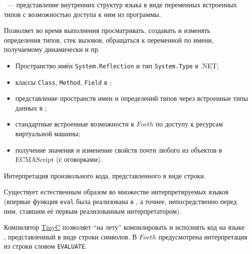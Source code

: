 
\ --- представление внутренних структур
языка в виде переменных встроенных типов с возможностью доступа к ним из
программы.

Позволяет во время выполнения просматривать, создавать и изменять определения
типов, стек вызовов, обращаться к переменной по имени, получаемому динамически и
пр.

\begin{itemize}[nosep]
  \item 
Пространство имён \verb|System.Reflection| и тип \verb|System.Type| в .NET;
  \item 
классы \verb|Class|, \verb|Method|, \verb|Field| в \java;
  \item 
представление пространств имен и определений типов через встроенные типы данных
в \py;
  \item 
стандартные встроенные возможности в $Forth$ по доступу к ресурсам виртуальной
машины;
  \item 
получение значения и изменение свойств почти любого из объектов в ECMAScript (с
оговорками).
\end{itemize}


Интерпретация произвольного кода, представленного в виде строки.

Существует естественным образом во множестве интерпретируемых языков (впервые
функция \verb|eval| была реализована в \lisp, а точнее, непосредственно перед
ним, ставшим её первым реализованным интерпретатором).

Компилятор \href{https://ru.wikipedia.org/wiki/Tiny_C_Compiler}{TinyC} позволяет
``на лету'' компилировать и исполнять код на языке \ci, представленный в виде
строки символов. В
\href{https://ru.wikipedia.org/wiki/%D0%A4%D0%BE%D1%80%D1%82_(%D1%8F%D0%B7%D1%8B%D0%BA_%D0%BF%D1%80%D0%BE%D0%B3%D1%80%D0%B0%D0%BC%D0%BC%D0%B8%D1%80%D0%BE%D0%B2%D0%B0%D0%BD%D0%B8%D1%8F)}{$Forth$}
предусмотрена интерпретация из строки словом \verb|EVALUATE|.

\secup

\secup
